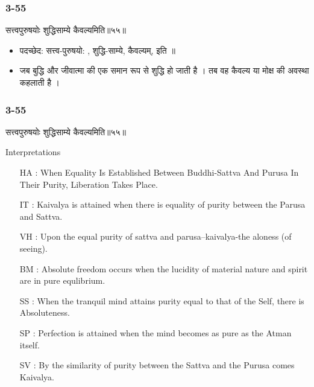 \begin{frame}[fragile]\frametitle{3-55}
\begin{sanskrit}
सत्त्वपुरुषयोः शुद्धिसाम्ये कैवल्यमिति॥५५॥
\end{sanskrit}

\begin{itemize}
\item पदच्छेद:  सत्त्व-पुरुषयो: , शुद्धि-साम्ये, कैवल्यम्, इति ॥
\item जब बुद्धि और जीवात्मा की एक समान रूप से शुद्धि हो जाती है । तब वह कैवल्य या मोक्ष की अवस्था कहलाती है ।
\end{itemize}
\end{frame}


\begin{frame}[fragile]\frametitle{3-55}
\begin{sanskrit}
सत्त्वपुरुषयोः शुद्धिसाम्ये कैवल्यमिति॥५५॥
\end{sanskrit}

Interpretations
\begin{itemize}	
\item [HA]: When Equality Is Established Between Buddhi-Sattva And Purusa In Their Purity, Liberation Takes Place.
\item [IT]: Kaivalya is attained when there is equality of purity between the Parusa and Sattva.
\item [VH]: Upon the equal purity of sattva and parusa–kaivalya-the aloness (of seeing).
\item [BM]: Absolute freedom occurs when the lucidity of material nature and spirit are in pure equlibrium.
\item [SS]: When the tranquil mind attains purity equal to that of the Self, there is Absoluteness.
\item [SP]: Perfection is attained when the mind becomes as pure as the Atman itself.
\item [SV]: By the similarity of purity between the Sattva and the Purusa comes Kaivalya. 
\end{itemize}
\end{frame}

